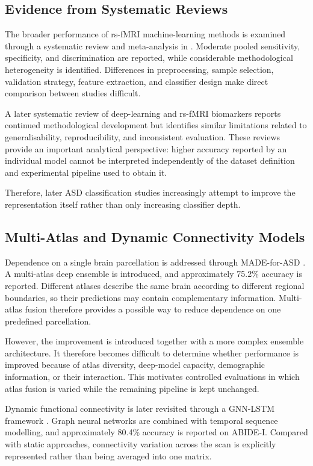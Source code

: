\documentclass[a4paper,fleqn]{cas-sc}
\begin{document}
\subsection{Evidence from Systematic Reviews}

The broader performance of rs-fMRI machine-learning methods is examined through a systematic review and meta-analysis in \cite{Santanaetal2022}. Moderate pooled sensitivity, specificity, and discrimination are reported, while considerable methodological heterogeneity is identified. Differences in preprocessing, sample selection, validation strategy, feature extraction, and classifier design make direct comparison between studies difficult.

A later systematic review of deep-learning and rs-fMRI biomarkers \cite{Hudaetal2024} reports continued methodological development but identifies similar limitations related to generalisability, reproducibility, and inconsistent evaluation. These reviews provide an important analytical perspective: higher accuracy reported by an individual model cannot be interpreted independently of the dataset definition and experimental pipeline used to obtain it.

Therefore, later ASD classification studies increasingly attempt to improve the representation itself rather than only increasing classifier depth.

\subsection{Multi-Atlas and Dynamic Connectivity Models}

Dependence on a single brain parcellation is addressed through MADE-for-ASD \cite{Liuetal2024MADE}. A multi-atlas deep ensemble is introduced, and approximately 75.2\% accuracy is reported. Different atlases describe the same brain according to different regional boundaries, so their predictions may contain complementary information. Multi-atlas fusion therefore provides a possible way to reduce dependence on one predefined parcellation.

However, the improvement is introduced together with a more complex ensemble architecture. It therefore becomes difficult to determine whether performance is improved because of atlas diversity, deep-model capacity, demographic information, or their interaction. This motivates controlled evaluations in which atlas fusion is varied while the remaining pipeline is kept unchanged.

Dynamic functional connectivity is later revisited through a GNN-LSTM framework \cite{Tangetal2025GNNLSTM}. Graph neural networks are combined with temporal sequence modelling, and approximately 80.4\% accuracy is reported on ABIDE-I. Compared with static approaches, connectivity variation across the scan is explicitly represented rather than being averaged into one matrix.
\end{document}
